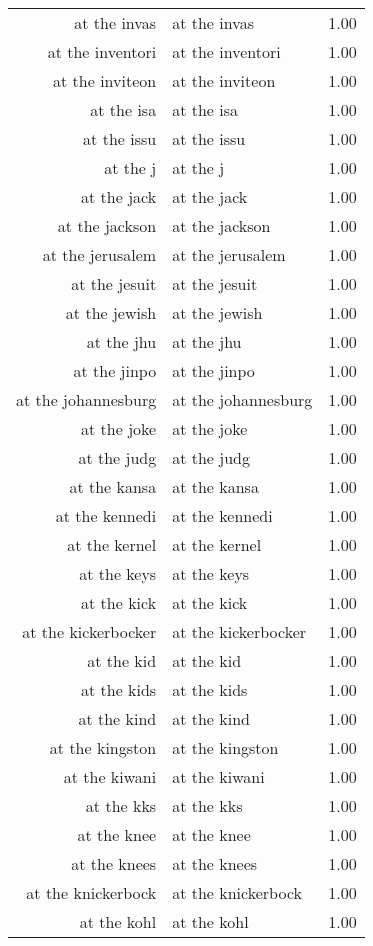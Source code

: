 \begin{table}[ht]
\begin{tabular}{rlr}
  at the invas & at the invas & 1.00 \\ 
  at the inventori & at the inventori & 1.00 \\ 
  at the inviteon & at the inviteon & 1.00 \\ 
  at the isa & at the isa & 1.00 \\ 
  at the issu & at the issu & 1.00 \\ 
  at the j & at the j & 1.00 \\ 
  at the jack & at the jack & 1.00 \\ 
  at the jackson & at the jackson & 1.00 \\ 
  at the jerusalem & at the jerusalem & 1.00 \\ 
  at the jesuit & at the jesuit & 1.00 \\ 
  at the jewish & at the jewish & 1.00 \\ 
  at the jhu & at the jhu & 1.00 \\ 
  at the jinpo & at the jinpo & 1.00 \\ 
  at the johannesburg & at the johannesburg & 1.00 \\ 
  at the joke & at the joke & 1.00 \\ 
  at the judg & at the judg & 1.00 \\ 
  at the kansa & at the kansa & 1.00 \\ 
  at the kennedi & at the kennedi & 1.00 \\ 
  at the kernel & at the kernel & 1.00 \\ 
  at the keys & at the keys & 1.00 \\ 
  at the kick & at the kick & 1.00 \\ 
  at the kickerbocker & at the kickerbocker & 1.00 \\ 
  at the kid & at the kid & 1.00 \\ 
  at the kids & at the kids & 1.00 \\ 
  at the kind & at the kind & 1.00 \\ 
  at the kingston & at the kingston & 1.00 \\ 
  at the kiwani & at the kiwani & 1.00 \\ 
  at the kks & at the kks & 1.00 \\ 
  at the knee & at the knee & 1.00 \\ 
  at the knees & at the knees & 1.00 \\ 
  at the knickerbock & at the knickerbock & 1.00 \\ 
  at the kohl & at the kohl & 1.00 \\ 

\end{tabular}
\end{table}
